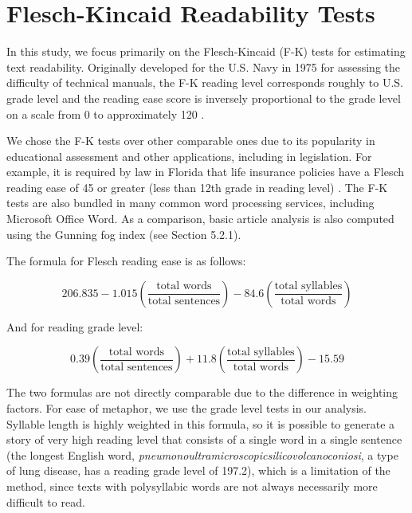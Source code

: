 \section{Flesch-Kincaid Readability Tests} 
In this study, we focus primarily on the Flesch-Kincaid (F-K) tests for estimating text readability. Originally developed for the U.S. Navy in 1975 for assessing the difficulty of technical manuals, the F-K reading level corresponds roughly to U.S. grade level and the reading ease score is inversely proportional to the grade level on a scale from 0 to approximately 120 \cite{kincaid1975derivation}.

We chose the F-K tests over other comparable ones due to its popularity in educational assessment and other applications, including in legislation. For example, it is required by law in Florida that life insurance policies have a Flesch reading ease of 45 or greater (less than 12th grade in reading level) \cite{Statu37online}. The F-K tests are also bundled in many common word processing services, including Microsoft Office Word. As a comparison, basic article analysis is also computed using the Gunning fog index (see Section 5.2.1).

The formula for Flesch reading ease is as follows:

$$206.835 - 1.015 \left( \frac{\mbox{total words}}{\mbox{total sentences}} \right) - 84.6 \left( \frac{\mbox{total syllables}}{\mbox{total words}} \right)$$

And for reading grade level:

$$0.39 \left ( \frac{\mbox{total words}}{\mbox{total sentences}} \right ) + 11.8 \left ( \frac{\mbox{total syllables}}{\mbox{total words}} \right ) - 15.59$$
 
The two formulas are not directly comparable due to the difference in weighting factors. For ease of metaphor, we use the grade level tests in our analysis. Syllable length is highly weighted in this formula, so it is possible to generate a story of very high reading level that consists of a single word in a single sentence (the longest English word, \emph{pneumonoultramicroscopicsilicovolcanoconiosi}, a type of lung disease, has a reading grade level of 197.2), which is a limitation of the method, since texts with polysyllabic words are not always necessarily more difficult to read.
 

 
 















